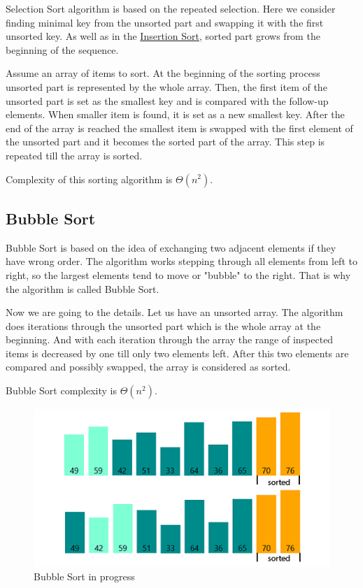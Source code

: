 \documentclass[
  field=inf,
  biblatex,
  language=english,
  glossaries,
  theorems=false,
  index
]{kidiplom}
\begin{document}
Selection Sort algorithm is based on the repeated selection. Here we consider finding minimal key from the unsorted part and swapping it with the first unsorted key. As well as in the \hyperref[sec:insertion]{Insertion Sort}, sorted part grows from the beginning of the sequence.

Assume an array of items to sort. At the beginning of the sorting process unsorted part is represented by the whole array. Then, the first item of the unsorted part is set as the smallest key and is compared with the follow-up elements. When smaller item is found, it is set as a new smallest key. After the end of the array is reached the smallest item is swapped with the first element of the unsorted part and it becomes the sorted part of the array. This step is repeated till the array is sorted.

Complexity of this sorting algorithm is $\Theta(n^2)$.

\subsection{Bubble Sort}
\label{sec:bubble}
Bubble Sort is based on the idea of exchanging two adjacent elements if they have wrong order. The algorithm works stepping through all elements from left to right, so the largest elements tend to move or "bubble" to the right. That is why the algorithm is called Bubble Sort.

Now we are going to the details. Let us have an unsorted array. The algorithm does iterations through the unsorted part which is the whole array at the beginning. And with each iteration through the array the range of inspected items is decreased by one till only two elements left. After this two elements are compared and possibly swapped, the array is considered as sorted.

Bubble Sort complexity is $\Theta(n^2)$.

\begin{figure}[H]
\begin{center}
	
	\includegraphics[scale=0.7]{img/Bubblesort.png}
	\caption{Bubble Sort in progress}\label{fig:bubble}
\end{center}
\end{figure}
\end{document}

